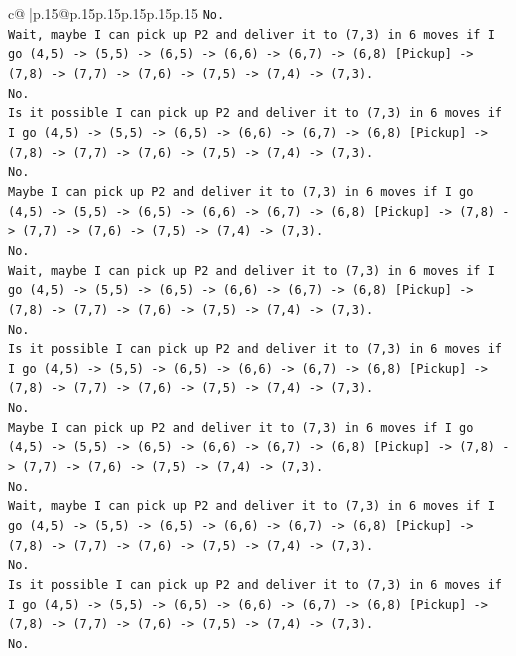 \documentclass{article}
\begin{document}
{\begin{supertabular}{c@{$\;$}|p{.15\linewidth}@{}p{.15\linewidth}p{.15\linewidth}p{.15\linewidth}p{.15\linewidth}p{.15\linewidth}}
{{{\texttt{No.} \\
\texttt{Wait, maybe I can pick up P2 and deliver it to (7,3) in 6 moves if I go (4,5) {-}> (5,5) {-}> (6,5) {-}> (6,6) {-}> (6,7) {-}> (6,8) {[}Pickup{]} {-}> (7,8) {-}> (7,7) {-}> (7,6) {-}> (7,5) {-}> (7,4) {-}> (7,3).} \\
\texttt{No.} \\
\texttt{Is it possible I can pick up P2 and deliver it to (7,3) in 6 moves if I go (4,5) {-}> (5,5) {-}> (6,5) {-}> (6,6) {-}> (6,7) {-}> (6,8) {[}Pickup{]} {-}> (7,8) {-}> (7,7) {-}> (7,6) {-}> (7,5) {-}> (7,4) {-}> (7,3).} \\
\texttt{No.} \\
\texttt{Maybe I can pick up P2 and deliver it to (7,3) in 6 moves if I go (4,5) {-}> (5,5) {-}> (6,5) {-}> (6,6) {-}> (6,7) {-}> (6,8) {[}Pickup{]} {-}> (7,8) {-}> (7,7) {-}> (7,6) {-}> (7,5) {-}> (7,4) {-}> (7,3).} \\
\texttt{No.} \\
\texttt{Wait, maybe I can pick up P2 and deliver it to (7,3) in 6 moves if I go (4,5) {-}> (5,5) {-}> (6,5) {-}> (6,6) {-}> (6,7) {-}> (6,8) {[}Pickup{]} {-}> (7,8) {-}> (7,7) {-}> (7,6) {-}> (7,5) {-}> (7,4) {-}> (7,3).} \\
\texttt{No.} \\
\texttt{Is it possible I can pick up P2 and deliver it to (7,3) in 6 moves if I go (4,5) {-}> (5,5) {-}> (6,5) {-}> (6,6) {-}> (6,7) {-}> (6,8) {[}Pickup{]} {-}> (7,8) {-}> (7,7) {-}> (7,6) {-}> (7,5) {-}> (7,4) {-}> (7,3).} \\
\texttt{No.} \\
\texttt{Maybe I can pick up P2 and deliver it to (7,3) in 6 moves if I go (4,5) {-}> (5,5) {-}> (6,5) {-}> (6,6) {-}> (6,7) {-}> (6,8) {[}Pickup{]} {-}> (7,8) {-}> (7,7) {-}> (7,6) {-}> (7,5) {-}> (7,4) {-}> (7,3).} \\
\texttt{No.} \\
\texttt{Wait, maybe I can pick up P2 and deliver it to (7,3) in 6 moves if I go (4,5) {-}> (5,5) {-}> (6,5) {-}> (6,6) {-}> (6,7) {-}> (6,8) {[}Pickup{]} {-}> (7,8) {-}> (7,7) {-}> (7,6) {-}> (7,5) {-}> (7,4) {-}> (7,3).} \\
\texttt{No.} \\
\texttt{Is it possible I can pick up P2 and deliver it to (7,3) in 6 moves if I go (4,5) {-}> (5,5) {-}> (6,5) {-}> (6,6) {-}> (6,7) {-}> (6,8) {[}Pickup{]} {-}> (7,8) {-}> (7,7) {-}> (7,6) {-}> (7,5) {-}> (7,4) {-}> (7,3).} \\
\texttt{No.} \\
}}}
\end{supertabular}}
\end{document}
